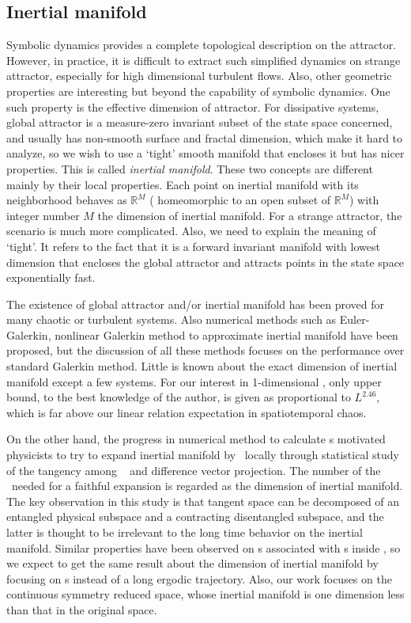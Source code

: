 \subsection{Inertial manifold}
\label{subsec:IM}
Symbolic dynamics provides a complete topological description on the attractor.
However, in practice, it is difficult to extract such simplified dynamics on
strange attractor, especially
for high dimensional turbulent flows. Also, other geometric properties are
interesting but beyond the capability of symbolic dynamics. One such property is
the effective dimension of attractor. For dissipative systems, global attractor
is a measure-zero invariant subset of the state space concerned, and usually has non-smooth
surface and fractal dimension, which make it hard to analyze, so we wish to
use a `tight' smooth manifold that encloses it but has nicer properties. This
is called \emph{inertial manifold}.
These two concepts are different mainly by their
local properties. Each point on inertial manifold with
its neighborhood behaves as $\mathbb{R}^M$ ( homeomorphic to an
open subset
of $\mathbb{R}^M$) with integer number $M$ the dimension of inertial manifold.
For a strange attractor, the scenario is much more complicated. Also, we need
to
explain the meaning of `tight'. It refers to the fact that it is a
forward invariant manifold with
lowest dimension that encloses the global attractor and attracts
points in the state
space exponentially fast.

The existence of global attractor and/or inertial manifold has been proved
for many chaotic or turbulent systems. Also
numerical methods
such as Euler-Galerkin, nonlinear Galerkin method to approximate
inertial manifold have been proposed, but the discussion of
all these methods focuses on the performance over standard Galerkin method.
Little is known about the exact dimension of
inertial manifold except a few systems.
For our interest in 1-dimensional \KSe, only upper bound,
to the best knowledge of the author, is given as
proportional to $L^{2.46}$,
which is far above our linear relation
expectation in spatiotemporal chaos.

On the other hand, the progress
in numerical method to calculate \emph{\cLv}s
motivated physicists to
try to expand inertial manifold by
\cLvs\ locally through statistical study of the tangency among
\cLvs\  and
difference vector projection. The number of the \cLvs\ needed
for a faithful expansion is
regarded as the dimension of inertial manifold. The key observation
in this study is that tangent space can be decomposed of an
entangled physical subspace and a contracting disentangled subspace,
and the latter is thought to be irrelevant to the long time behavior
on the inertial manifold.
Similar properties have been observed on \Fv s
associated with \po s inside \KSe, so we expect to get
the same result about the dimension of inertial manifold by focusing
on \po s instead of a long ergodic trajectory.
Also, our work focuses on the continuous symmetry reduced space,
whose inertial manifold is one dimension less than that in the original
space.

